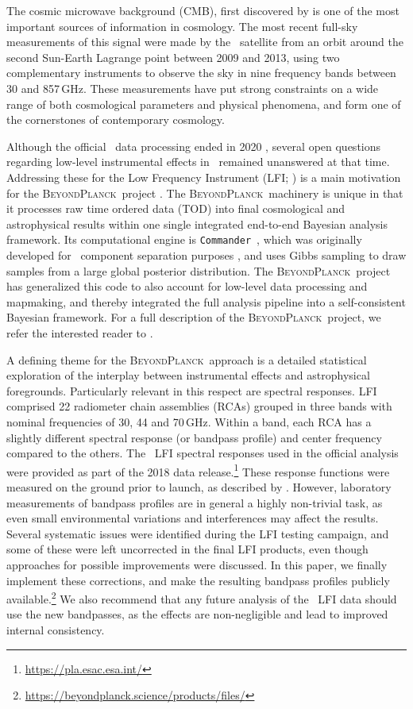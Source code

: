 \documentclass[twocolumn]{aa}
\def\commander{\texttt{Commander}}
\newcommand{\BP}{\textsc{BeyondPlanck}}
\newcommand{\?}[1]{\textcolor{red}{{\bf [#1]}}}
\begin{document}
The cosmic microwave background (CMB), first discovered by
\citet{penzias:1965} is one of the most important sources of
information in cosmology. The most recent full-sky measurements of
this signal were made by the \Planck\ satellite \citep{planck2016-l01}
from an orbit around the second Sun-Earth Lagrange point between 2009
and 2013, using two complementary instruments to observe the sky in
nine frequency bands between 30 and 857\,GHz. These measurements have
put strong constraints on a wide range of both cosmological parameters
and physical phenomena, and form one of the cornerstones of
contemporary cosmology.

Although the official \Planck\ data processing ended in 2020
\citep{planck2016-l01,npipe}, several open questions regarding low-level
instrumental effects in \Planck\ remained unanswered at that time. Addressing
these for the Low Frequency Instrument (LFI; \citealp{planck2016-l02}) is a main
motivation for the \BP\ project \citep{bp01}. The \BP\ machinery is unique in
that it processes raw time ordered data (TOD) into final cosmological and
astrophysical results within one single integrated end-to-end Bayesian analysis
framework. Its computational engine is \commander\
\citep{eriksen:2004,eriksen2008,bp03}, which was originally developed for
\Planck\ component separation purposes
\citep{planck2013-p06,planck2014-a12,planck2016-l04}, and uses Gibbs sampling
\citep{geman:1984} to draw samples from a large global posterior distribution.
The \BP\ project has generalized this code to also account for low-level data
processing and mapmaking, and thereby integrated the full analysis pipeline into
a self-consistent Bayesian framework. For a full description of the \BP\
project, we refer the interested reader to \citet{bp01}.

A defining theme for the \BP\ approach is a detailed statistical
exploration of the interplay between instrumental effects and
astrophysical foregrounds.  Particularly relevant in this respect are
spectral responses. LFI comprised 22 radiometer chain assemblies
(RCAs) grouped in three bands with nominal frequencies of 30, 44 and
70\,GHz. Within a band, each RCA has a slightly different spectral
response (or bandpass profile) and center frequency compared to the
others. The \Planck\ LFI spectral responses used in the official
analysis were provided as part of the 2018 data
release.\footnote{\url{https://pla.esac.esa.int/}} These response
functions were measured on the ground prior to launch, as described by
\citet{zonca2009}.  However, laboratory measurements of bandpass
profiles are in general a highly non-trivial task, as even small
environmental variations and interferences may affect the
results. Several systematic issues were identified during the LFI
testing campaign, and some of these were left uncorrected in the final
LFI products, even though approaches for possible improvements were
discussed. In this paper, we finally implement these corrections, and
make the resulting bandpass profiles publicly
available.\footnote{\url{https://beyondplanck.science/products/files/}}
We also recommend that any future analysis of the \Planck\ LFI data
should use the new bandpasses, as the effects are non-negligible and
lead to improved internal consistency.
\end{document}

